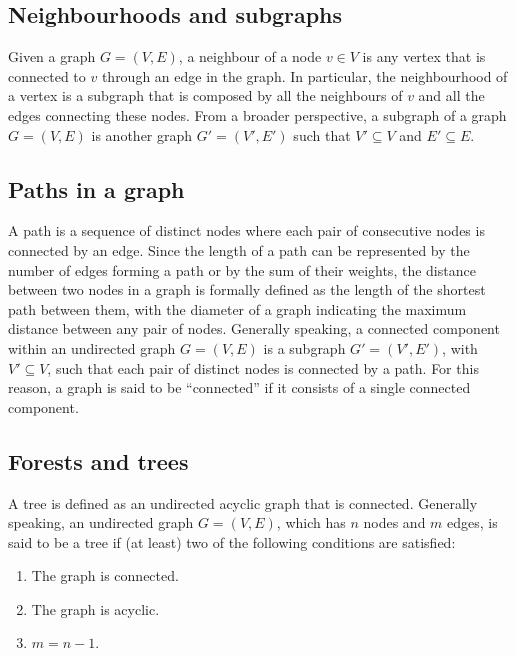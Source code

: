 \documentclass{report}
\begin{document}
\subsection{Neighbourhoods and subgraphs}
Given a graph $\displaystyle G = (V, E)$, a neighbour of a node $\displaystyle v \in V$ is any vertex that is connected to $\displaystyle v$ through an edge in the graph. \newline
In particular, the neighbourhood of a vertex is a subgraph that is composed by all the neighbours of $\displaystyle v$ and all the edges connecting these nodes. \newline
From a broader perspective, a subgraph of a graph $\displaystyle G = (V, E)$ is another graph $\displaystyle G' = (V', E')$ such that $\displaystyle V' \subseteq V$ and $\displaystyle E' \subseteq E$.
\subsection{Paths in a graph}
A path is a sequence of distinct nodes where each pair of consecutive nodes is connected by an edge. \newline
Since the length of a path can be represented by the number of edges forming a path or by the sum of their weights, the distance between two nodes in a graph is formally defined as the length of the shortest path between them, with the diameter of a graph indicating the maximum distance between any pair of nodes. \newline
Generally speaking, a connected component within an undirected graph $\displaystyle G = (V, E)$ is a subgraph $\displaystyle G' = (V', E')$, with $\displaystyle V' \subseteq V$, such that each pair of distinct nodes is connected by a path. \newline
For this reason, a graph is said to be ``connected'' if it consists of a single connected component.
\subsection{Forests and trees}
A tree is defined as an undirected acyclic graph that is connected. \newline
Generally speaking, an undirected graph $\displaystyle G = (V, E)$, which has $\displaystyle n$ nodes and $\displaystyle m$ edges, is said to be a tree if (at least) two of the following conditions are satisfied:
\begin{enumerate}
    \item The graph is connected.
    \item The graph is acyclic.
    \item $\displaystyle m = n - 1$.
\end{enumerate}
\end{document}
